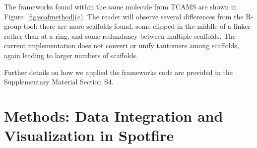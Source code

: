 \documentclass[journal=jacsat,biochem,manuscript=article]{achemso}
\newcommand*\fref[1]{Figure~\ref{fig:#1}}
\begin{document}
The frameworks found within the same molecule from TCAMS are shown
in \fref{scafmethod}(c).  The reader will observe several differences
from the R-group tool: there are more scaffolds found, some clipped in
the middle of a linker rather than at a ring, and some redundancy
between multiple scaffolds. The current implementation does not
convert or unify tautomers among scaffolds, again leading to larger
numbers of scaffolds. %

Further details on how we applied 
the frameworks code are provided in the Supplementary Material Section S4. 

%
%


\section{Methods: Data Integration and Visualization in Spotfire}
\label{sec:methods2}
\end{document}
